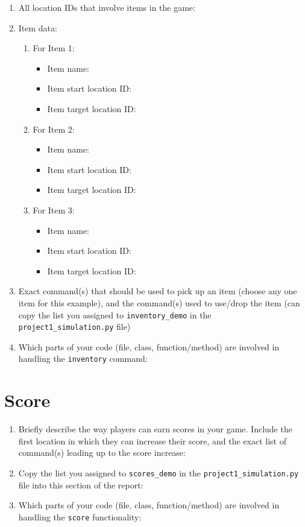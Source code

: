 \documentclass[11pt]{article}
\begin{document}
\begin{enumerate}
\item All location IDs that involve items in the game:

\item Item data:
\begin{enumerate}
    \item For Item 1:
    \begin{itemize}
    \item Item name:
    \item Item start location ID:
    \item Item target location ID:
    \end{itemize}
        \item For Item 2:
    \begin{itemize}
    \item Item name:
    \item Item start location ID:
    \item Item target location ID:
    \end{itemize}
        \item For Item 3:
    \begin{itemize}
    \item Item name:
    \item Item start location ID:
    \item Item target location ID:
    \end{itemize}
\end{enumerate}

    \item Exact command(s) that should be used to pick up an item (choose any one item for this example), and the command(s) used to use/drop the item (can copy the list you assigned to \texttt{inventory\_demo} in the \texttt{project1\_simulation.py} file)
    \item Which parts of your code (file, class, function/method) are involved in handling the \texttt{inventory} command:
\end{enumerate}

\section*{Score}
\begin{enumerate}

    \item Briefly describe the way players can earn scores in your game. Include the first location in which they can increase their score, and the exact list of command(s) leading up to the score increase:


    \item Copy the list you assigned to \texttt{scores\_demo} in the \texttt{project1\_simulation.py} file into this section of the report:


    \item Which parts of your code (file, class, function/method) are involved in handling the \texttt{score} functionality:
\end{enumerate}
\end{document}
